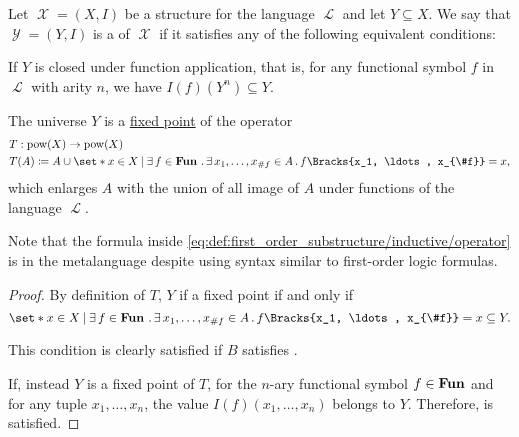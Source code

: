 \begin{definition}\label{def:first_order_substructure}
  Let \( \mscrX = (X, I) \) be a structure for the language \( \mscrL \) and let \( Y \subseteq X \). We say that \( \mscrY = (Y, I) \) is a  of \( \mscrX \) if it satisfies any of the following equivalent conditions:

  \begin{thmenum}
     If \( Y \) is closed under function application, that is, for any functional symbol \( f \) in \( \mscrL \) with arity \( n \), we have \( I(f)(Y^n) \subseteq Y \).

     The universe \( Y \) is a \hyperref[def:fixed_point]{fixed point} of the operator
    \begin{equation}\label{eq:def:first_order_substructure/inductive/operator}
      \begin{aligned}
        &T: \pow(X) \to \pow(X) \\
        &T(A) \coloneqq A \cup \set*{ x \in X \given \qexists{f \in \boldop{Fun}} \qexists{x_1, \ldots, x_{\#f} \in A} f\Bracks{x_1, \ldots, x_{\#f}} = x },
      \end{aligned}
    \end{equation}
    which enlarges \( A \) with the union of all image of \( A \) under functions of the language \( \mscrL \).
  \end{thmenum}
\end{definition}
\begin{comments}
  \item Note that the formula inside \eqref{eq:def:first_order_substructure/inductive/operator} is in the metalanguage despite using syntax similar to first-order logic formulas.
\end{comments}
\begin{proof}
  By definition of \( T \), \( Y \) if a fixed point if and only if
  \begin{equation*}
    \set*{ x \in X \given \qexists{f \in \boldop{Fun}} \qexists{x_1, \ldots, x_{\#f} \in A} f\Bracks{x_1, \ldots, x_{\#f}} = x } \subseteq Y.
  \end{equation*}

  This condition is clearly satisfied if \( B \) satisfies .

  If, instead \( Y \) is a fixed point of \( T \), for the \( n \)-ary functional symbol \( f \in \operatorname{\mathbf{Fun}} \) and for any tuple \( x_1, \ldots, x_n \), the value \( I(f)(x_1, \ldots, x_n) \) belongs to \( Y \). Therefore,  is satisfied.
\end{proof}

